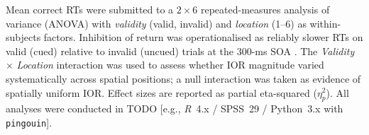 \documentclass[12pt, a4paper]{article}
\begin{document}
Mean correct RTs were submitted to a $2 \times 6$
repeated-measures analysis of variance (ANOVA) with
\textit{validity} (valid, invalid) and \textit{location} (1--6)
as within-subjects factors.
Inhibition of return was operationalised as reliably slower RTs on
valid (cued) relative to invalid (uncued) trials at the 300-ms SOA
\parencite{posner1984components}.
The \textit{Validity} $\times$ \textit{Location} interaction was used
to assess whether IOR magnitude varied systematically across spatial
positions; a null interaction was taken as evidence of spatially
uniform IOR.
Effect sizes are reported as partial eta-squared
($\eta^{2}_{p}$).
All analyses were conducted in TODO [e.g.,
\textit{R}~4.x \parencite{rcore2024} /
SPSS~29 / Python~3.x with \texttt{pingouin}].


\printbibliography
\end{document}
